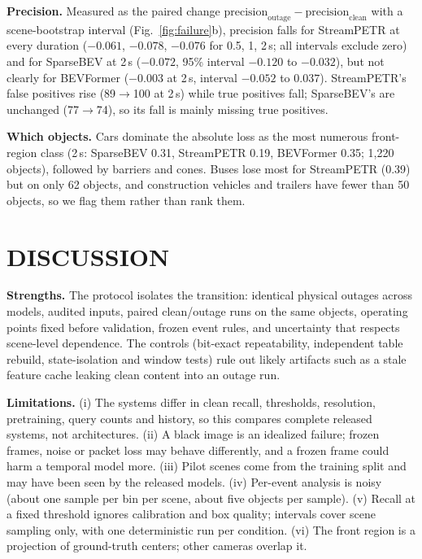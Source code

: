 \documentclass[letterpaper, 10 pt, conference]{ieeeconf}
\begin{document}
\textbf{Precision.} Measured as the paired change $\text{precision}_{\text{outage}}-\text{precision}_{\text{clean}}$ with a scene-bootstrap interval (Fig.~\ref{fig:failure}b), precision falls for StreamPETR at every duration ($-0.061$, $-0.078$, $-0.076$ for 0.5, 1, 2\,s; all intervals exclude zero) and for SparseBEV at 2\,s ($-0.072$, 95\% interval $-0.120$ to $-0.032$), but not clearly for BEVFormer ($-0.003$ at 2\,s, interval $-0.052$ to $0.037$). StreamPETR's false positives rise (89$\to$100 at 2\,s) while true positives fall;
SparseBEV's are unchanged (77$\to$74), so its fall is mainly missing true positives.

\textbf{Which objects.} Cars dominate the absolute loss as the most numerous front-region class (2\,s: SparseBEV 0.31, StreamPETR 0.19, BEVFormer 0.35; 1,220 objects), followed by barriers and cones.
Buses lose most for StreamPETR (0.39) but on only 62 objects, and construction vehicles and trailers have fewer than 50 objects, so we flag them rather than rank them.


\section{DISCUSSION}

\textbf{Strengths.} The protocol isolates the transition: identical physical outages across models, audited inputs, paired clean/outage runs on the same objects, operating points fixed
before validation, frozen event rules, and uncertainty that respects scene-level dependence. The controls (bit-exact repeatability, independent table rebuild, state-isolation and window tests) rule out likely
artifacts such as a stale feature cache leaking clean content into an outage run.

\textbf{Limitations.} (i) The systems differ in clean recall, thresholds, resolution, pretraining, query counts and history, so this compares complete released systems, not architectures. (ii) A black image is an idealized failure; frozen frames, noise or packet loss
may behave differently, and a frozen frame could harm a temporal model more. (iii) Pilot scenes come from the training split and may have been seen by the released models. (iv) Per-event analysis is noisy (about one sample per bin per scene, about five objects per sample).
(v) Recall at a fixed threshold ignores calibration and box quality; intervals cover scene sampling only, with one deterministic run per condition. (vi) The front region is a projection of ground-truth centers; other cameras overlap it.
\end{document}
